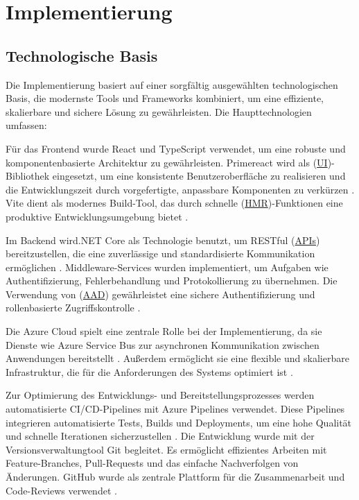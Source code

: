 \chapter{Implementierung}
\label{chap:implementierung}

\section{Technologische Basis}
Die Implementierung basiert auf einer sorgfältig ausgewählten technologischen Basis, die modernste Tools und Frameworks kombiniert, um eine effiziente, skalierbare und sichere Lösung zu gewährleisten. Die Haupttechnologien umfassen:

Für das Frontend wurde React und TypeScript verwendet, um eine robuste und komponentenbasierte Architektur zu gewährleisten. Primereact wird als (\hyperref[abkuerzungen]{UI})-Bibliothek eingesetzt, um eine konsistente Benutzeroberfläche zu realisieren und die Entwicklungszeit durch vorgefertigte, anpassbare Komponenten zu verkürzen \cite{facebook2021react}. Vite dient als modernes Build-Tool, das durch schnelle (\hyperref[abkuerzungen]{HMR})-Funktionen eine produktive Entwicklungsumgebung bietet \cite{vite2022docs}.

Im Backend wird.NET Core als Technologie benutzt, um RESTful (\hyperref[abkuerzungen]{APIs}) bereitzustellen, die eine zuverlässige und standardisierte Kommunikation ermöglichen \cite{fielding2000rest}. Middleware-Services wurden implementiert, um Aufgaben wie Authentifizierung, Fehlerbehandlung und Protokollierung zu übernehmen. Die Verwendung von (\hyperref[abkuerzungen]{AAD}) gewährleistet eine sichere Authentifizierung und rollenbasierte Zugriffskontrolle \cite{aad2023}.

Die Azure Cloud spielt eine zentrale Rolle bei der Implementierung, da sie Dienste wie Azure Service Bus zur asynchronen Kommunikation zwischen Anwendungen bereitstellt \cite{azureServiceBus2024}. Außerdem ermöglicht sie eine flexible und skalierbare Infrastruktur, die für die Anforderungen des Systems optimiert ist \cite{azureDocumentation}.

Zur Optimierung des Entwicklungs- und Bereitstellungsprozesses werden automatisierte CI/CD-Pipelines mit 
Azure Pipelines verwendet. Diese Pipelines integrieren automatisierte Tests, Builds und Deployments, um eine hohe Qualität und schnelle Iterationen sicherzustellen \cite{ciCdScalability}.
Die Entwicklung wurde mit der Versionsverwaltungtool Git begleitet. Es ermöglicht effizientes Arbeiten mit Feature-Branches, Pull-Requests und das einfache Nachverfolgen von Änderungen. GitHub wurde als zentrale Plattform für die Zusammenarbeit und Code-Reviews verwendet \cite{chacon2021git}.

